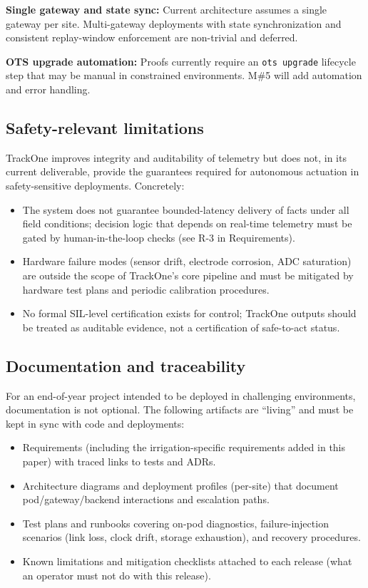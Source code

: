 \textbf{Single gateway and state sync:} Current architecture assumes a single gateway per site. Multi-gateway deployments with state synchronization and consistent replay-window enforcement are non-trivial and deferred.

\textbf{OTS upgrade automation:} Proofs currently require an \texttt{ots upgrade} lifecycle step that may be manual in constrained environments. M\#5 will add automation and error handling.

\subsection{Safety-relevant limitations}
TrackOne improves integrity and auditability of telemetry but does not, in its current deliverable, provide the guarantees required for autonomous actuation in safety-sensitive deployments. Concretely:
\begin{itemize}[nosep]
  \item The system does not guarantee bounded-latency delivery of facts under all field conditions; decision logic that depends on real-time telemetry must be gated by human-in-the-loop checks (see R-3 in Requirements).
  \item Hardware failure modes (sensor drift, electrode corrosion, ADC saturation) are outside the scope of TrackOne's core pipeline and must be mitigated by hardware test plans and periodic calibration procedures.
  \item No formal SIL-level certification exists for control; TrackOne outputs should be treated as auditable evidence, not a certification of safe-to-act status.
\end{itemize}

\subsection{Documentation and traceability}
For an end-of-year project intended to be deployed in challenging environments, documentation is not optional. The following artifacts are ``living'' and must be kept in sync with code and deployments:
\begin{itemize}[nosep]
  \item Requirements (including the irrigation-specific requirements added in this paper) with traced links to tests and ADRs.
  \item Architecture diagrams and deployment profiles (per-site) that document pod/gateway/backend interactions and escalation paths.
  \item Test plans and runbooks covering on-pod diagnostics, failure-injection scenarios (link loss, clock drift, storage exhaustion), and recovery procedures.
  \item Known limitations and mitigation checklists attached to each release (what an operator must not do with this release).
\end{itemize}

